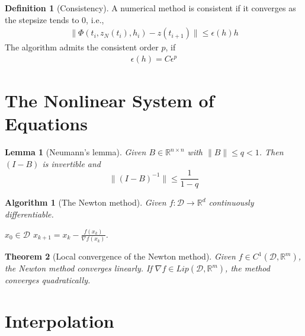 \documentclass[a4paper,12pt,oneside,fleqn]{book}
\newtheorem{theorem}{Theorem}[section]
\newtheorem{algorithm}{Algorithm}[section]
\newtheorem{lemma}[theorem]{Lemma}
\theoremstyle{definition}
\newtheorem{definition}{Definition}[section]
\theoremstyle{remark}
\begin{document}
\begin{definition}[Consistency]
	A numerical method is consistent if it converges as the stepsize tends to 0, i.e., 
	\begin{align*}
		\|\Phi(t_i, z_N(t_i), h_i)  - z(t_{i + 1})\|\le  \epsilon(h) h
	\end{align*}
	The algorithm admits the consistent order $p$, if 
	\begin{align*}
		\epsilon(h) = C\epsilon^p
	\end{align*}
\end{definition}




\section{The Nonlinear System of Equations}
\begin{lemma}[Neumann's lemma]
	Given $B \in \mathbb{R}^{n \times n}$ with $\|B\| \le q < 1$. Then $(I - B)$ is invertible and 
	\begin{equation}
		\|(I - B)^{-1}\| \le \frac{1}{1 - q}
	\end{equation}
\end{lemma}

\begin{algorithm}[The Newton method]
Given $f: \mathcal{D} \rightarrow \mathbb{R}^d$ continuously differentiable. 
\begin{algorithmic}
\State $x_0 \in \mathcal{D}$
\State $x_{k + 1} = x_k - \frac{f(x_k)}{\nabla f(x_k)}$. 
\EndWhile
\end{algorithmic}
\end{algorithm}

\begin{theorem}[Local convergence of the Newton method]
	Given $f \in C^1(\mathcal{D}, \mathbb{R}^m)$, the Newton method converges linearly. 
	If $\nabla f \in Lip(\mathcal{D}, \mathbb{R}^m)$, the method converges quadratically. 	
\end{theorem}

\section{Interpolation}
\end{document}
